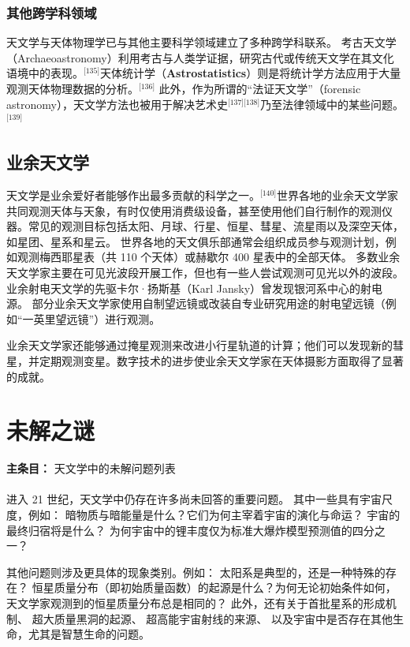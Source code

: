 \subsubsection{其他跨学科领域}
天文学与天体物理学已与其他主要科学领域建立了多种跨学科联系。  
考古天文学（Archaeoastronomy）利用考古与人类学证据，研究古代或传统天文学在其文化语境中的表现。\(^\text{[135]}\)天体统计学（\textbf{Astrostatistics}）则是将统计学方法应用于大量观测天体物理数据的分析。\(^\text{[136]}\) 此外，作为所谓的“法证天文学”（forensic astronomy），天文学方法也被用于解决艺术史\(^\text{[137][138]}\)乃至法律领域中的某些问题。\(^\text{[139]}\)
\subsection{业余天文学}
天文学是业余爱好者能够作出最多贡献的科学之一。\(^\text{[140]}\)世界各地的业余天文学家共同观测天体与天象，有时仅使用消费级设备，甚至使用他们自行制作的观测仪器。常见的观测目标包括太阳、月球、行星、恒星、彗星、流星雨以及深空天体，如星团、星系和星云。  
世界各地的天文俱乐部通常会组织成员参与观测计划，例如观测梅西耶星表（共 110 个天体）或赫歇尔 400 星表中的全部天体。\cite{ref141,ref142}  
多数业余天文学家主要在可见光波段开展工作，但也有一些人尝试观测可见光以外的波段。业余射电天文学的先驱卡尔·扬斯基（Karl Jansky）曾发现银河系中心的射电源。\cite{ref143}  
部分业余天文学家使用自制望远镜或改装自专业研究用途的射电望远镜（例如“一英里望远镜”）进行观测。\cite{ref144,ref145}

业余天文学家还能够通过掩星观测来改进小行星轨道的计算；他们可以发现新的彗星，并定期观测变星。数字技术的进步使业余天文学家在天体摄影方面取得了显著的成就。\cite{ref146,ref147,ref148}

\section*{未解之谜}
\noindent \textbf{主条目：} 天文学中的未解问题列表  

\paragraph{}
进入 21 世纪，天文学中仍存在许多尚未回答的重要问题。  
其中一些具有宇宙尺度，例如：  
暗物质与暗能量是什么？它们为何主宰着宇宙的演化与命运？\cite{ref149}  
宇宙的最终归宿将是什么？\cite{ref150}  
为何宇宙中的锂丰度仅为标准大爆炸模型预测值的四分之一？\cite{ref151}  

其他问题则涉及更具体的现象类别。例如：  
太阳系是典型的，还是一种特殊的存在？\cite{ref152}  
恒星质量分布（即初始质量函数）的起源是什么？为何无论初始条件如何，天文学家观测到的恒星质量分布总是相同的？\cite{ref153}  
此外，还有关于首批星系的形成机制、\cite{ref154} 超大质量黑洞的起源、\cite{ref155} 超高能宇宙射线的来源、\cite{ref156} 以及宇宙中是否存在其他生命，尤其是智慧生命的问题。\cite{ref157,ref158}
